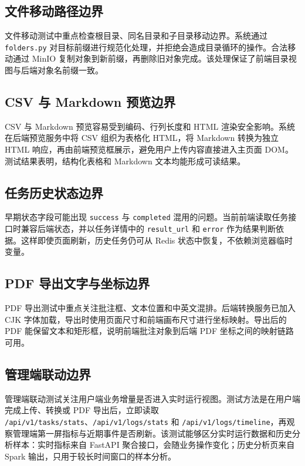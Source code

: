 \subsection{文件移动路径边界}

文件移动测试中重点检查根目录、同名目录和子目录移动边界。系统通过 \texttt{folders.py} 对目标前缀进行规范化处理，并拒绝会造成目录循环的操作。合法移动通过 MinIO 复制对象到新前缀，再删除旧对象完成。该处理保证了前端目录视图与后端对象名前缀一致。

\subsection{CSV 与 Markdown 预览边界}

CSV 与 Markdown 预览容易受到编码、行列长度和 HTML 渲染安全影响。系统在后端预览服务中将 CSV 组织为表格化 HTML，将 Markdown 转换为独立 HTML 响应，再由前端预览框展示，避免用户上传内容直接进入主页面 DOM。测试结果表明，结构化表格和 Markdown 文本均能形成可读结果。

\subsection{任务历史状态边界}

早期状态字段可能出现 \texttt{success} 与 \texttt{completed} 混用的问题。当前前端读取任务接口时兼容后端状态，并以任务详情中的 \texttt{result\_url} 和 \texttt{error} 作为结果判断依据。这样即使页面刷新，历史任务仍可从 Redis 状态中恢复，不依赖浏览器临时变量。

\subsection{PDF 导出文字与坐标边界}

PDF 导出测试中重点关注批注框、文本位置和中英文混排。后端转换服务已加入 CJK 字体加载，导出时使用页面尺寸和前端画布尺寸进行坐标映射。导出后的 PDF 能保留文本和矩形框，说明前端批注对象到后端 PDF 坐标之间的映射链路可用。

\subsection{管理端联动边界}

管理端联动测试关注用户端业务增量是否进入实时运行视图。测试方法是在用户端完成上传、转换或 PDF 导出后，立即读取 \texttt{/api/v1/tasks/stats}、\texttt{/api/v1/logs/stats} 和 \texttt{/api/v1/logs/timeline}，再观察管理端第一屏指标与近期事件是否刷新。该测试能够区分实时运行数据和历史分析样本：实时指标来自 FastAPI 聚合接口，会随业务操作变化；历史分析页来自 Spark 输出，只用于较长时间窗口的样本分析。

